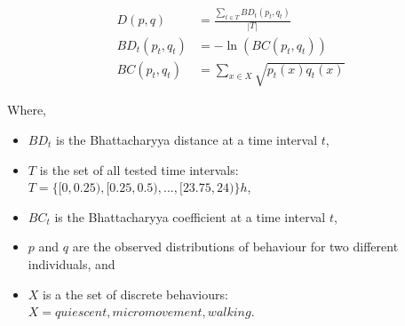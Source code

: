 \documentclass[a4paper,twoside,openright]{article}
\begin{document}
\begin{align*}
D(p,q) &=  \frac{\sum_{t \in T}{BD_t(p_t,q_t)}}{|T|} \\
BD_t(p_t,q_t) &= -\ln (BC(p_t,q_t))\\
BC(p_t,q_t) &= \sum_{x\in X} \sqrt{p_t(x) q_t(x)}
\end{align*}


Where,
\begin{itemize}
\item $BD_t$ is the Bhattacharyya distance at a time interval $t$,
\item $T$ is the set of all tested time intervals: $T=\{[0, 0.25), [0.25,0.5), ..., [23.75, 24)\} h$,
\item $BC_t$ is the Bhattacharyya coefficient at a time interval $t$,
\item $p$ and $q$ are the observed distributions of behaviour for two different individuals, and
\item $X$ is a the set of discrete behaviours: $X = {quiescent, micromovement, walking}$.
\end{itemize}
\end{document}
